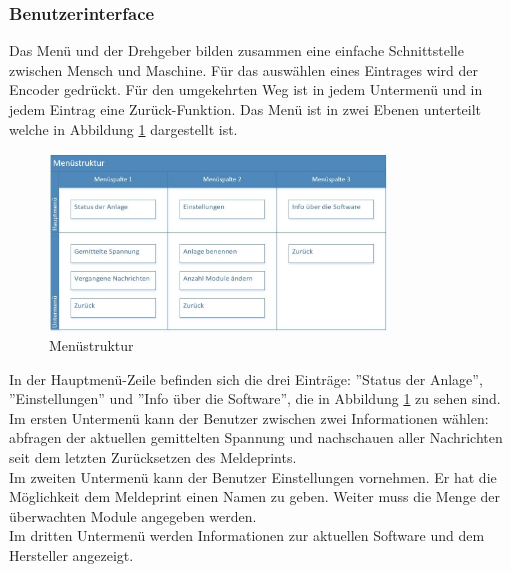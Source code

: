\subsubsection{Benutzerinterface}\label{Benutzerinterface}
Das Menü und der Drehgeber bilden zusammen eine einfache Schnittstelle zwischen Mensch und Maschine. Für das auswählen eines Eintrages wird der Encoder gedrückt. Für den umgekehrten Weg ist in jedem Untermenü und in jedem Eintrag eine Zurück-Funktion. Das Menü ist in zwei Ebenen unterteilt welche in Abbildung \ref{fig:structure-menu} dargestellt ist.

\begin{figure}[htbp] 
  \centering
     \includegraphics[width=0.8\textwidth]{graphics/structure-menu}
  \caption{Menüstruktur}
  \label{fig:structure-menu}
\end{figure}
In der Hauptmenü-Zeile befinden sich die drei Einträge: ''Status der Anlage'', ''Einstellungen'' und ''Info über die Software'', die in Abbildung \ref{fig:structure-menu} zu sehen sind.\\
Im ersten Untermenü kann der Benutzer zwischen zwei Informationen wählen: abfragen der aktuellen gemittelten Spannung und nachschauen aller Nachrichten seit dem letzten Zurücksetzen des Meldeprints.\\
Im zweiten Untermenü kann der Benutzer Einstellungen vornehmen. Er hat die Möglichkeit dem Meldeprint einen Namen zu geben. Weiter muss die Menge der überwachten Module angegeben werden.\\
Im dritten Untermenü werden Informationen zur aktuellen Software und dem Hersteller angezeigt.\\